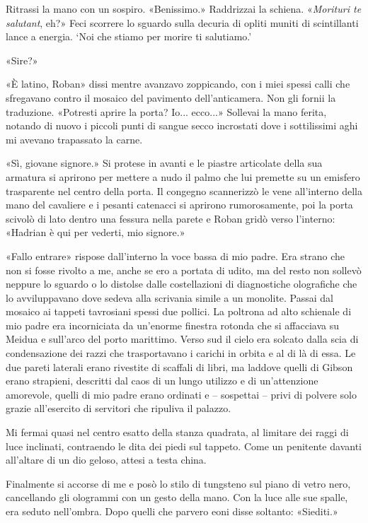 Ritrassi la mano con un sospiro. «Benissimo.» Raddrizzai la schiena.
«\emph{Morituri te salutant}, eh?» Feci scorrere lo sguardo sulla
decuria di opliti muniti di scintillanti lance a energia. `Noi che
stiamo per morire ti salutiamo.'

«Sire?»

«È latino, Roban» dissi mentre avanzavo zoppicando, con i miei spessi
calli che sfregavano contro il mosaico del pavimento dell'anticamera.
Non gli fornii la traduzione. «Potresti aprire la porta? Io... ecco...»
Sollevai la mano ferita, notando di nuovo i piccoli punti di sangue
secco incrostati dove i sottilissimi aghi mi avevano trapassato la
carne.

«Sì, giovane signore.» Si protese in avanti e le piastre articolate
della sua armatura si aprirono per mettere a nudo il palmo che lui
premette su un emisfero trasparente nel centro della porta. Il congegno
scannerizzò le vene all'interno della mano del cavaliere e i pesanti
catenacci si aprirono rumorosamente, poi la porta scivolò di lato dentro
una fessura nella parete e Roban gridò verso l'interno: «Hadrian è qui
per vederti, mio signore.»

«Fallo entrare» rispose dall'interno la voce bassa di mio padre. Era
strano che non si fosse rivolto a me, anche se ero a portata di udito,
ma del resto non sollevò neppure lo sguardo o lo distolse dalle
costellazioni di diagnostiche olografiche che lo {avviluppavano} dove
sedeva alla scrivania simile a un monolite. Passai dal mosaico ai
tappeti tavrosiani spessi due pollici. La poltrona ad alto schienale di
mio padre era incorniciata da un'enorme finestra rotonda che si
affacciava su Meidua e sull'arco del porto marittimo. Verso sud il cielo
era solcato dalla scia di condensazione dei razzi che trasportavano i
carichi in orbita e al di là di essa. Le due pareti laterali erano
rivestite di scaffali di libri, ma laddove quelli di Gibson erano
strapieni, descritti dal caos di un lungo utilizzo e di un'attenzione
amorevole, quelli di mio padre erano ordinati e -- sospettai -- privi di
polvere solo grazie all'esercito di servitori che ripuliva il palazzo.

Mi fermai quasi nel centro esatto della stanza quadrata, al limitare dei
raggi di luce inclinati, contraendo le dita dei piedi sul tappeto. Come
un penitente davanti all'altare di un dio geloso, attesi a testa china.

Finalmente si accorse di me e posò lo stilo di tungsteno sul piano di
vetro nero, cancellando gli ologrammi con un gesto della mano. Con la
luce alle sue spalle, era seduto nell'ombra. Dopo quelli che parvero
eoni disse soltanto: «Siediti.»

